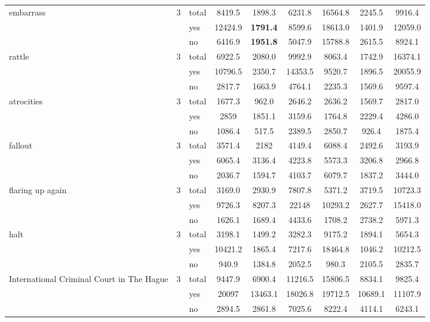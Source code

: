 {\begin{longtable}{@{ }p{2.2cm}@{ }l@{ }l@{}*{6}{S[table-format=5.1]}@{}}
\tablevspace
{  embarrass} &  3 &  total &  8419.5 &  1898.3 &  6231.8 &  16564.8 &  2245.5 &  9916.4\\
&  &  yes &  12424.9 & \bfseries 1791.4 &  8599.6 &  18613.0 &  1401.9 &  12059.0\\
 &  &  no &  6416.9 & \bfseries 1951.8 &  5047.9 &  15788.8 &  2615.5 &  8924.1\\

\tablevspace
{  rattle} &  3 &  total &  6922.5 &  2080.0 &  9992.9 &  8063.4 &  1742.9 &  16374.1\\
&  &  yes &  10796.5 &  2350.7 &  14353.5 &  9520.7 &  1896.5 &  20055.9\\
 &  &  no &  2817.7 &  1663.9 &  4764.1 &  2235.3 &  1569.6 &  9597.4\\

\tablevspace
{  atrocities} &  3 &  total &  1677.3 &  962.0 &  2646.2 &  2636.2 &  1569.7 &  2817.0\\
&  &  yes &  2859 &  1851.1 &  3159.6 &  1764.8 &  2229.4 &  4286.0\\
 &  &  no &  1086.4 &  517.5 &  2389.5 &  2850.7 &  926.4 &  1875.4\\

\tablevspace
{  fallout} &  3 &  total &  3571.4 &  2182 &  4149.4 &  6088.4 &  2492.6 &  3193.9\\
&  &  yes &  6065.4 &  3136.4 &  4223.8 &  5573.3 &  3206.8 &  2966.8\\
 &  &  no &  2036.7 &  1594.7 &  4103.7 &  6079.7 &  1837.2 &  3444.0\\

\tablevspace
{  flaring up again} &  3 &  total &  3169.0 &  2930.9 &  7807.8 &  5371.2 &  3719.5 &  10723.3\\
&  &  yes &  9726.3 &  8207.3 &  22148 &  10293.2 &  2627.7 &  15418.0\\
 &  &  no &  1626.1 &  1689.4 &  4433.6 &  1708.2 &  2738.2 &  5971.3\\

\tablevspace
{  halt} &  3 &  total &  3198.1 &  1499.2 &  3282.3 &  9175.2 &  1894.1 &  5654.3\\
&  &  yes &  10421.2 &  1865.4 &  7217.6 &  18464.8 &  1046.2 &  10212.5\\
 &  &  no &  940.9 &  1384.8 &  2052.5 &  980.3 &  2105.5 &  2835.7\\

\tablevspace
International Criminal Court in The Hague &  3 &  total &  9447.9 &  6900.4 &  11216.5 &  15806.5 &  8834.1 &  9825.4\\
&  &  yes &  20097 &  13463.1 &  18026.8 &  19712.5 &  10689.1 &  11107.9\\
 &  &  no &  2894.5 &  2861.8 &  7025.6 &  8222.4 &  4114.1 &  6243.1\\


\end{longtable}}
